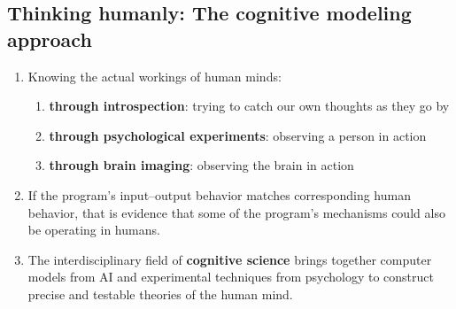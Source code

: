 








\subsection{Thinking humanly: The cognitive modeling approach}\label{Artificial Intelligence: Introduction/Approaches to AI/Thinking humanly: The cognitive modeling approach}

\begin{enumerate}
    \item Knowing the actual workings of human minds:
    \begin{enumerate}
        \item \textbf{through introspection}: trying to catch our own thoughts as they go by
        \hfill \cite{ai/book/Artificial-Intelligence-A-Modern-Approach/Russell-Norvig}

        \item \textbf{through psychological experiments}: observing a person in action
        \hfill \cite{ai/book/Artificial-Intelligence-A-Modern-Approach/Russell-Norvig}

        \item \textbf{through brain imaging}: observing the brain in action
        \hfill \cite{ai/book/Artificial-Intelligence-A-Modern-Approach/Russell-Norvig}
    \end{enumerate}

    \item  If the program’s input–output behavior matches corresponding human behavior, that is evidence that some of the program’s mechanisms could also be operating in humans.
    \hfill \cite{ai/book/Artificial-Intelligence-A-Modern-Approach/Russell-Norvig}

    \item The interdisciplinary field of \textbf{cognitive science}\label{Artificial Intelligence: Introduction/Approaches to AI/Thinking humanly: The cognitive modeling approach/cognitive science} brings together computer models from AI and experimental techniques from psychology to construct precise and testable theories of the human mind.
    \hfill \cite{ai/book/Artificial-Intelligence-A-Modern-Approach/Russell-Norvig}
\end{enumerate}







